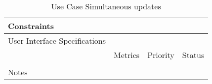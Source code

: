 \begin{table}[H]
\begin{tabularx}{\linewidth}{|l|X|X|X|}
    \hline Constraints                   & \multicolumn{3}{l|}{}                                                                                 \\

    \hline User Interface Specifications & \multicolumn{3}{l|}{}                                                                                 \\

    \hline \multirow{2}{*}{}             & Metrics                                                                           & Priority & Status \\
    \cline{2-4}                          &                                                                                   &          &        \\
    \hline Notes                         & \multicolumn{3}{l|}{}                                                                                 \\
    \hline
  \end{tabularx}
  \caption{Use Case Simultaneous updates}
  \label{tab:use_case_simultaneous_updates}
\end{table}

